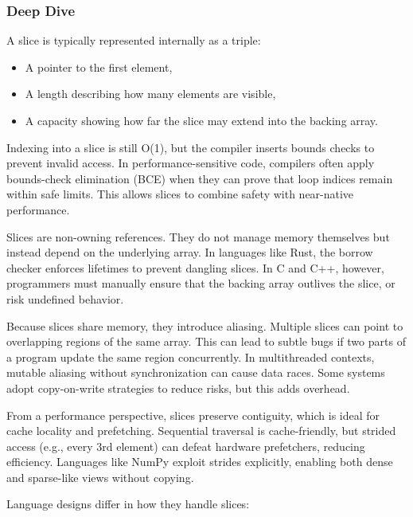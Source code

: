 \documentclass[
  letterpaper,
  DIV=11,
  numbers=noendperiod]{scrreprt}
\providecommand{\tightlist}{%
  \setlength{\itemsep}{0pt}\setlength{\parskip}{0pt}}
\begin{document}
\subsubsection{Deep Dive}\label{deep-dive-11}

A slice is typically represented internally as a triple:

\begin{itemize}
\tightlist
\item
  A pointer to the first element,
\item
  A length describing how many elements are visible,
\item
  A capacity showing how far the slice may extend into the backing
  array.
\end{itemize}

Indexing into a slice is still O(1), but the compiler inserts bounds
checks to prevent invalid access. In performance-sensitive code,
compilers often apply bounds-check elimination (BCE) when they can prove
that loop indices remain within safe limits. This allows slices to
combine safety with near-native performance.

Slices are non-owning references. They do not manage memory themselves
but instead depend on the underlying array. In languages like Rust, the
borrow checker enforces lifetimes to prevent dangling slices. In C and
C++, however, programmers must manually ensure that the backing array
outlives the slice, or risk undefined behavior.

Because slices share memory, they introduce aliasing. Multiple slices
can point to overlapping regions of the same array. This can lead to
subtle bugs if two parts of a program update the same region
concurrently. In multithreaded contexts, mutable aliasing without
synchronization can cause data races. Some systems adopt copy-on-write
strategies to reduce risks, but this adds overhead.

From a performance perspective, slices preserve contiguity, which is
ideal for cache locality and prefetching. Sequential traversal is
cache-friendly, but strided access (e.g., every 3rd element) can defeat
hardware prefetchers, reducing efficiency. Languages like NumPy exploit
strides explicitly, enabling both dense and sparse-like views without
copying.

Language designs differ in how they handle slices:
\end{document}
